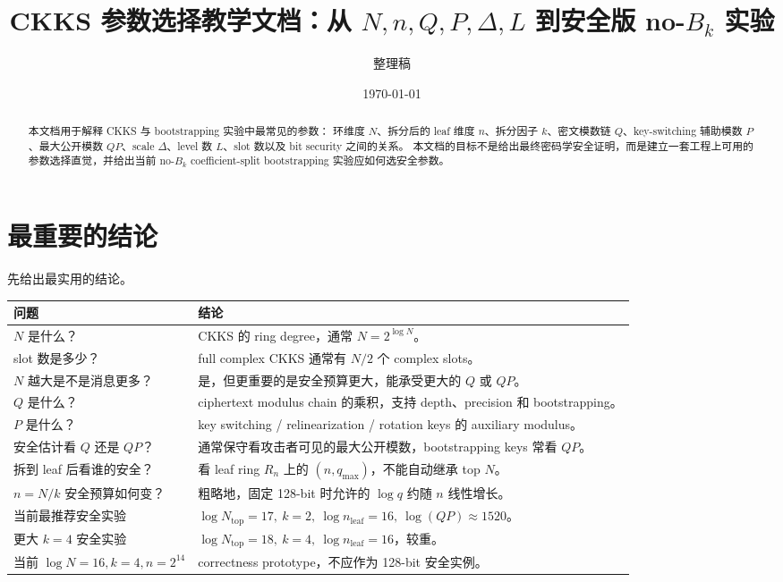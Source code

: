 \documentclass[UTF8,11pt,a4paper]{ctexart}
\title{CKKS 参数选择教学文档：从 $N,n,Q,P,\Delta,L$ 到安全版 no-$B_k$ 实验}
\author{整理稿}
\date{\today}
\begin{document}
\maketitle

\begin{abstract}
本文档用于解释 CKKS 与 bootstrapping 实验中最常见的参数：
环维度 $N$、拆分后的 leaf 维度 $n$、拆分因子 $k$、密文模数链 $Q$、key-switching 辅助模数 $P$、最大公开模数 $QP$、scale $\Delta$、level 数 $L$、slot 数以及 bit security 之间的关系。
本文档的目标不是给出最终密码学安全证明，而是建立一套工程上可用的参数选择直觉，并给出当前 no-$B_k$ coefficient-split bootstrapping 实验应如何选安全参数。
\end{abstract}

\tableofcontents
\newpage

\section{最重要的结论}

先给出最实用的结论。

\begin{center}
\begin{tabular}{ll}
\toprule
问题 & 结论 \\
\midrule
$N$ 是什么？ & CKKS 的 ring degree，通常 $N=2^{\log N}$。\\
slot 数是多少？ & full complex CKKS 通常有 $N/2$ 个 complex slots。\\
$N$ 越大是不是消息更多？ & 是，但更重要的是安全预算更大，能承受更大的 $Q$ 或 $QP$。\\
$Q$ 是什么？ & ciphertext modulus chain 的乘积，支持 depth、precision 和 bootstrapping。\\
$P$ 是什么？ & key switching / relinearization / rotation keys 的 auxiliary modulus。\\
安全估计看 $Q$ 还是 $QP$？ & 通常保守看攻击者可见的最大公开模数，bootstrapping keys 常看 $QP$。\\
拆到 leaf 后看谁的安全？ & 看 leaf ring $R_n$ 上的 $(n,q_{\max})$，不能自动继承 top $N$。\\
$n=N/k$ 安全预算如何变？ & 粗略地，固定 128-bit 时允许的 $\log q$ 约随 $n$ 线性增长。\\
当前最推荐安全实验 & $\log N_{\text{top}}=17,\ k=2,\ \log n_{\text{leaf}}=16,\ \log(QP)\approx 1520$。\\
更大 $k=4$ 安全实验 & $\log N_{\text{top}}=18,\ k=4,\ \log n_{\text{leaf}}=16$，较重。\\
当前 $\log N=16,k=4,n=2^{14}$ & correctness prototype，不应作为 128-bit 安全实例。\\
\bottomrule
\end{tabular}
\end{center}
\end{document}
